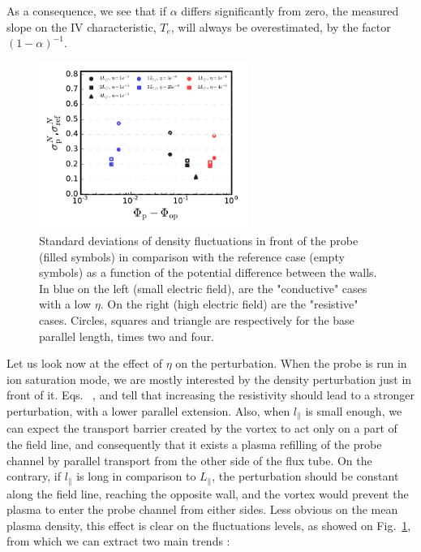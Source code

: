 \documentclass[cpp,a4paper,fleqn,twoside%
]{w-art}
\makeatletter
\renewcommand*{\eqref}[1]{%
  \hyperref[{#1}]{\textup{\tagform@{\ref*{#1}}}}%
}
\makeatother
\begin{document}
As a consequence, we see that if $\alpha$ differs significantly from 
zero, the measured slope on the IV characteristic, $T_e$,  
will always be overestimated, by the factor $(1-\alpha)^{-1}$. 
\vspace{2mm}
\begin{figure}
\begin{minipage}[c]{68mm}
\includegraphics[width=68mm]{figures/perturbAmplEta.pdf}
\end{minipage}
\begin{minipage}[c]{\textwidth-68mm}
\caption{Standard deviations of density fluctuations in front of the 
probe (filled symbols) in comparison with the reference case (empty 
symbols) as a function of the 
potential difference between the walls. In blue on the left (small 
electric field), are the "conductive" cases with a low $\eta$. On the 
right (high electric field) are the "resistive" cases. Circles, squares 
and triangle are respectively for the base parallel length, times two 
and four.}
\label{fig:4}
\end{minipage}
\end{figure}

Let us look now at the effect of $\eta$ on the perturbation. When the 
probe is run in ion saturation mode, we are mostly interested by the 
density perturbation just in front of it. 
Eqs.~\eqref{ExtensionPerturbation}, \eqref{AmplitudePerturbation} and 
\eqref{eqConstantCurrent3} tell that increasing the resistivity should 
lead to a stronger perturbation, with a lower parallel extension. Also, 
when $l_\parallel$ is small enough, we can expect the transport 
barrier created by the vortex to act only on a part of the field line, and 
consequently that it exists a plasma refilling of the probe channel by 
parallel transport from the other side of the flux tube. On the 
contrary, if $l_\parallel$ is long in comparison to $L_\parallel$, the 
perturbation should be constant along the field line, reaching the 
opposite wall, and the vortex would prevent the plasma to enter the 
probe channel from either sides.
Less obvious on the mean plasma density, this effect is clear on the 
fluctuations levels, as showed on Fig.~\ref{fig:4}, from which we can 
extract two main trends :
\end{document}
